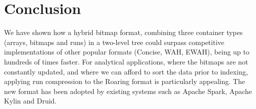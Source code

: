 \documentclass[times]{speauth}
\begin{document}
\begin{table}
\end{table}









\section{Conclusion}
\label{sec:conclusion}

We have shown how a hybrid bitmap format, combining three container
types (arrays, bitmaps and runs) in a two-level tree could
surpass competitive implementations of other popular formats (Concise,
WAH, EWAH), being up to hundreds of times faster. For analytical applications, where the bitmaps are not
constantly updated, and where we can afford to sort the data prior to
indexing, applying run compression to the Roaring format
is particularly appealing. The new format has been adopted by existing
systems such as  Apache Spark, Apache Kylin and Druid. 
\end{document}
